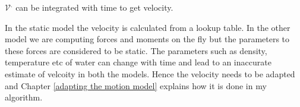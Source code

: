 \documentclass[12pt,draft]{dalcsthesis}
\begin{document}
$\mathcal{V}^{.}$ can be integrated with time to get velocity.

In the static model the velocity is calculated from a lookup table. In the other model we are computing forces and moments on the fly but the parameters to these forces are considered to be static. The parameters such as density, temperature etc of water can change with time and lead to an inaccurate estimate of velcoity in both the models. Hence the velocity needs to be adapted and Chapter \ref{adapting the motion model} explains how it is done in my algorithm.    

\end{document}
